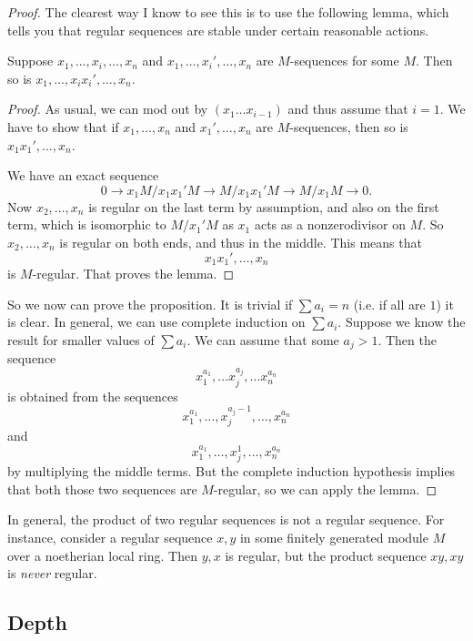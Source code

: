 \begin{proof}

The clearest way I know to see this is to use the following lemma, which tells
you that regular sequences are stable under certain reasonable actions.

\begin{lemma} 
Suppose $x_1, \dots, x_i, \dots, x_n$ and $x_1, \dots, x_i', \dots, x_n$ are
$M$-sequences for some $M$. Then so is $x_1, \dots, x_i x_i', \dots, x_n$.
\end{lemma} 

\begin{proof} 
As usual, we can mod out by $(x_1 \dots x_{i-1})$ and thus assume that $i=1$.
We have to show that if $x_1, \dots, x_n$ and $x_1', \dots, x_n$ are
$M$-sequences, then so is $x_1 x_1', \dots, x_n$.

We have an exact sequence
\[ 0 \to x_1 M/x_1 x_1' M \to M/x_1 x_1' M \to  M/x_1  M \to 0.  \]
Now $x_2, \dots, x_n$ is regular  on the last term by assumption, and also on
the first term, which is isomorphic to $M/x_1' M$ as $x_1$ acts as a
nonzerodivisor on $M$. So $x_2, \dots, x_n$ is regular on both ends, and thus
in the middle. This means that 
\[ x_1 x_1', \dots, x_n  \]
is $M$-regular. That proves the lemma. 
\end{proof} 

So we now can prove the proposition. It is trivial if $\sum a_i = n$ (i.e. if
all are $1$) it is clear. In general, we can use complete induction on $\sum
a_i$. Suppose we know the result for smaller values of $\sum a_i$. We can
assume that some $a_j >1$. 
Then  the sequence
\[ x_1^{a_1}, \dots x_j^{a_j} , \dots x_n^{a_n} \]
is obtained from the sequences
\[  x_1^{a_1}, \dots,x_j^{a_j - 1}, \dots, x_n^{a_n} \]
and
\[  x_1^{a_1}, \dots,x_j^{1}, \dots, x_n^{a_n} \]
by multiplying the middle terms. But the complete induction hypothesis implies
that both those two sequences are $M$-regular, so we can apply the lemma. 
\end{proof} 

In general, the product of two regular sequences is not a regular sequence. For
instance, consider a regular sequence $x,y$ in some finitely generated module $M$ over a
noetherian local ring. Then $y,x$ is regular, but the product sequence $xy, xy$
is \emph{never} regular.


\subsection{Depth}

